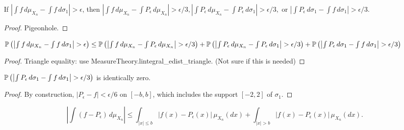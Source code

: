 \begin{lemma}
  \label{lem:f_pigeonhole}
  \notready
  If $\left|\int f\,d\mu_{X_n} - \int f\,d\sigma_1\right|>\epsilon$, then  $\left|\int f\,d\mu_{X_n} - \int P_\epsilon\,d\mu_{X_n}\right|>\epsilon/3, 
    \left|\int P_\epsilon\,d\mu_{X_n} - \int P_\epsilon\,d\sigma_1\right| >\epsilon/3,$ or $\left|\int P_\epsilon\,d\sigma_1 - \int f\,d\sigma_1\right|>\epsilon/3$.
\end{lemma}

\begin{proof}
  \notready
  Pigeonhole.
\end{proof}



\begin{lemma}
  \label{lem:f_probability_inequality}
  \notready
  $\bP\left( \left|\int f\,d\mu_{X_n} - \int f\,d\sigma_1\right|>\epsilon\right) \le \bP\left(\left|\int f\,d\mu_{X_n} - \int P_\epsilon\,d\mu_{X_n}\right|>\epsilon/3\right)
    + \bP\left(\left|\int P_\epsilon\,d\mu_{X_n} - \int P_\epsilon\,d\sigma_1\right| >\epsilon/3\right) 
    + \bP\left(\left|\int P_\epsilon\,d\sigma_1 - \int f\,d\sigma_1\right|>\epsilon/3\right)$
\end{lemma}

\begin{proof}
  \notready
  Triangle equality: use MeasureTheory.lintegral\_edist\_triangle. 
  (Not sure if this is needed)
\end{proof}


\begin{lemma}
  \label{lem:p_epsilon_minus_f_d_sigma_eq_zero}
  \notready
  $\bP\left(\left|\int P_\epsilon\,d\sigma_1 - \int f\,d\sigma_1\right|>\epsilon/3\right)$ is identically zero.
\end{lemma}

\begin{proof}
  \notready
  By construction, $|P_\epsilon-f|<\epsilon/6$ on $[-b,b]$, which includes the support $[-2,2]$ of $\sigma_1$.
\end{proof}

\begin{lemma}
  \label{lem:f_p_epsilon_inequality}
  \uses{}
  \notready
  \[ \left|\int (f-P_\epsilon)\,d\mu_{X_n}\right| \le \int_{|x|\le b} |f(x)-P_\epsilon(x)|\,\mu_{X_n}(dx) + \int_{|x|>b} |f(x)-P_\epsilon(x)|\,\mu_{X_n}(dx). \]
\end{lemma}

